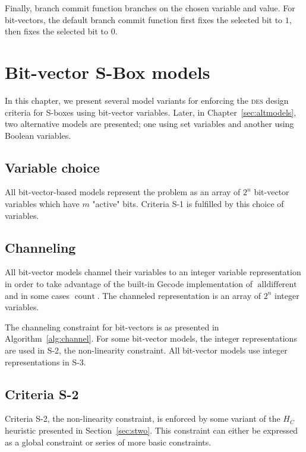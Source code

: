 \documentclass[a4paper,10pt,twoside,openright]{book}
\renewcommand{\sc}[1]{\textsc{\lowercase{#1}}}
\DeclareMathOperator{\alldifferent}{alldifferent}
\DeclareMathOperator{\funccount}{count}
\begin{document}
Finally, branch commit function 
branches on the chosen variable and value. 
For bit-vectors, 
the default branch commit function first fixes the selected bit to $1$, then fixes the selected bit to $0$.

\chapter{Bit-vector S-Box models}
\label{sec:bitvecmodels}

In this chapter, we present several model variants for enforcing the \sc{DES} design criteria for S-boxes using bit-vector variables.
Later, in Chapter~\ref{sec:altmodels}, two alternative models are presented; one using set variables and another using Boolean variables.

\section{Variable choice}
All bit-vector-based models represent the problem as an array of $2^n$ bit-vector variables which have $m$ "active" bits. 
Criteria S-1 is fulfilled by this choice of variables.

\section{Channeling}
All bit-vector models channel their variables to an integer variable representation in order to take advantage
of the built-in Gecode implementation of $\alldifferent$ and in some cases $\funccount$.
The channeled representation is an array of $2^n$ integer variables.

The channeling constraint for bit-vectors is as presented in Algorithm~\ref{alg:channel}. 
For some bit-vector models, the integer representations are used in S-2, the non-linearity constraint. 
All bit-vector models use integer representations in S-3.

\section{Criteria S-2}
Criteria S-2, the non-linearity constraint, is enforced by some variant of the $H_C$ heuristic presented in Section~\ref{sec:stwo}.
This constraint can either be expressed as a global constraint or series of more basic constraints.
\end{document}
